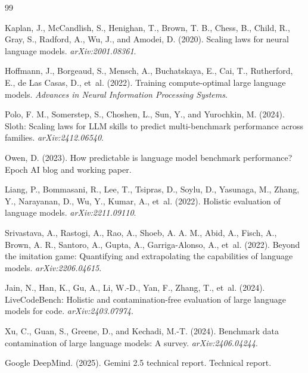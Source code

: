 \documentclass[11pt]{article}
\begin{document}
\begin{thebibliography}{99}

Kaplan, J., McCandlish, S., Henighan, T., Brown, T. B., Chess, B., Child, R., Gray, S., Radford, A., Wu, J., and Amodei, D. (2020).
\newblock Scaling laws for neural language models.
\newblock \emph{arXiv:2001.08361}.

Hoffmann, J., Borgeaud, S., Mensch, A., Buchatskaya, E., Cai, T., Rutherford, E., de Las Casas, D., et~al. (2022).
\newblock Training compute-optimal large language models.
\newblock \emph{Advances in Neural Information Processing Systems}.

Polo, F. M., Somerstep, S., Choshen, L., Sun, Y., and Yurochkin, M. (2024).
\newblock Sloth: Scaling laws for LLM skills to predict multi-benchmark performance across families.
\newblock \emph{arXiv:2412.06540}.

Owen, D. (2023).
\newblock How predictable is language model benchmark performance?
\newblock Epoch AI blog and working paper.

Liang, P., Bommasani, R., Lee, T., Tsipras, D., Soylu, D., Yasunaga, M., Zhang, Y., Narayanan, D., Wu, Y., Kumar, A., et~al. (2022).
\newblock Holistic evaluation of language models.
\newblock \emph{arXiv:2211.09110}.

Srivastava, A., Rastogi, A., Rao, A., Shoeb, A. A. M., Abid, A., Fisch, A., Brown, A. R., Santoro, A., Gupta, A., Garriga-Alonso, A., et~al. (2022).
\newblock Beyond the imitation game: Quantifying and extrapolating the capabilities of language models.
\newblock \emph{arXiv:2206.04615}.

Jain, N., Han, K., Gu, A., Li, W.-D., Yan, F., Zhang, T., et~al. (2024).
\newblock LiveCodeBench: Holistic and contamination-free evaluation of large language models for code.
\newblock \emph{arXiv:2403.07974}.

Xu, C., Guan, S., Greene, D., and Kechadi, M.-T. (2024).
\newblock Benchmark data contamination of large language models: A survey.
\newblock \emph{arXiv:2406.04244}.

Google DeepMind. (2025).
\newblock Gemini 2.5 technical report.
\newblock Technical report.


\end{thebibliography}
\end{document}
